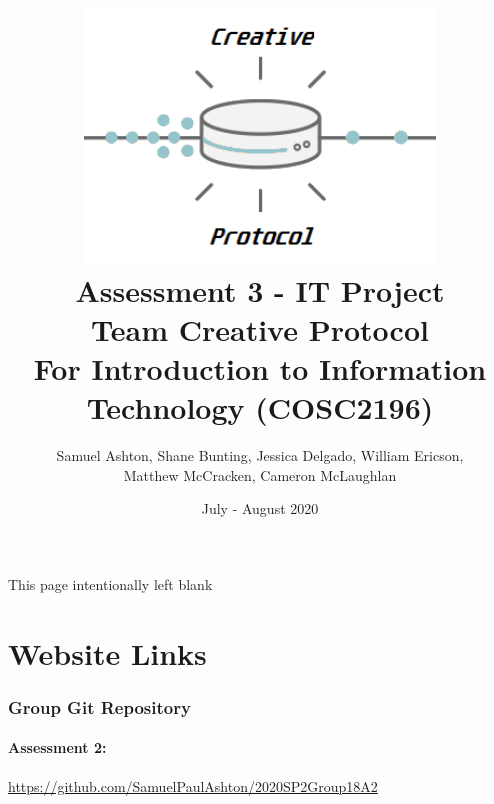\documentclass[11pt, oneside, a4paper, titlepage]{article}
\begin{document}
\title{\includegraphics[width=0.7\textwidth]{creative_protocol3}\\
Assessment 3 - IT Project\\
Team Creative Protocol\\
For Introduction to Information Technology (COSC2196)
\\
}

\author{Samuel Ashton, Shane Bunting, Jessica Delgado, William Ericson,\\
 Matthew McCracken, Cameron McLaughlan}

\date{July - August 2020}

\maketitle


\vspace*{\fill}
\begin{center}
This page intentionally left blank
\end{center}
\vspace*{\fill}
\newpage


\tableofcontents
\newpage

\section{Website Links}
\subsubsection{Group Git Repository}
\paragraph{Assessment 2:}\hfill \break
\url{https://github.com/SamuelPaulAshton/2020SP2Group18A2}
\end{document}
